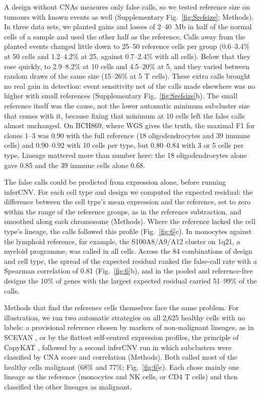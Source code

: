 A design without CNAs measures only false calls, so we tested reference size on tumours with known events as well (Supplementary Fig.~\ref{fig:Srefsize}; Methods). In three data sets, we planted gains and losses of 2--40~Mb in half of the normal cells of a sample and used the other half as the reference. Calls away from the planted events changed little down to 25--50 reference cells per group (0.6--3.4\% at 50 cells and 1.2--4.2\% at 25, against 0.7--2.4\% with all cells). Below that they rose quickly, to 2.9--8.2\% at 10 cells and 4.5--20\% at 5, and they varied between random draws of the same size (15--26\% at 5 T cells). These extra calls brought no real gain in detection: event sensitivity net of the calls made elsewhere was no higher with small references (Supplementary Fig.~\ref{fig:Srefsize}b). The small reference itself was the cause, not the lower automatic minimum subcluster size that comes with it, because fixing that minimum at 10 cells left the false calls almost unchanged. On BCH869, where WGS gives the truth, the maximal F1 for clones 1--3 was 0.90 with the full reference (18 oligodendrocytes and 39 immune cells) and 0.90--0.92 with 10 cells per type, but 0.80--0.84 with 3 or 5 cells per type. Lineage mattered more than number here: the 18 oligodendrocytes alone gave 0.85 and the 39 immune cells alone 0.68.

The false calls could be predicted from expression alone, before running inferCNV. For each cell type and design we computed the expected residual: the difference between the cell type's mean expression and the reference, set to zero within the range of the reference groups, as in the reference subtraction, and smoothed along each chromosome (Methods). Where the reference lacked the cell type's lineage, the calls followed this profile (Fig.~\ref{fig:6}c). In monocytes against the lymphoid reference, for example, the S100A8/A9/A12 cluster on 1q21, a myeloid programme, was called in all cells. Across the 84 combinations of design and cell type, the spread of the expected residual ranked the false-call rate with a Spearman correlation of 0.81 (Fig.~\ref{fig:6}b), and in the pooled and reference-free designs the 10\% of genes with the largest expected residual carried 51--99\% of the calls.

Methods that find the reference cells themselves face the same problem. For illustration, we ran two automatic strategies on all 2,625 healthy cells with no labels: a provisional reference chosen by markers of non-malignant lineages, as in SCEVAN \citep{defalco2023}, or by the flattest self-centred expression profiles, the principle of CopyKAT \citep{gao2021copykat}, followed by a second inferCNV run in which subclusters were classified by CNA score and correlation \citep{tirosh2016oligo, puram2017} (Methods). Both called most of the healthy cells malignant (68\% and 77\%; Fig.~\ref{fig:6}e). Each chose mainly one lineage as the reference (monocytes and NK cells, or CD4 T cells) and then classified the other lineages as malignant.

